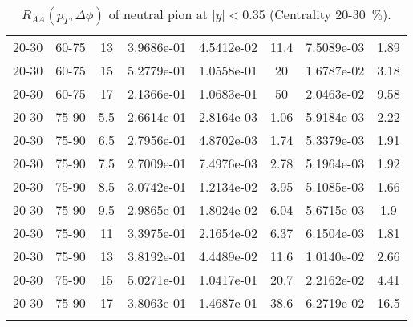 \begin{longtable}{|cccccccc|}
20-30 & 60-75 & 13 & 3.9686e-01 & 4.5412e-02 & 11.4 & 7.5089e-03 & 1.89 \\ 
20-30 & 60-75 & 15 & 5.2779e-01 & 1.0558e-01 & 20 & 1.6787e-02 & 3.18 \\ 
20-30 & 60-75 & 17 & 2.1366e-01 & 1.0683e-01 & 50 & 2.0463e-02 & 9.58 \\ 
\hline
20-30 & 75-90 & 5.5 & 2.6614e-01 & 2.8164e-03 & 1.06 & 5.9184e-03 & 2.22 \\ 
20-30 & 75-90 & 6.5 & 2.7956e-01 & 4.8702e-03 & 1.74 & 5.3379e-03 & 1.91 \\ 
20-30 & 75-90 & 7.5 & 2.7009e-01 & 7.4976e-03 & 2.78 & 5.1964e-03 & 1.92 \\ 
20-30 & 75-90 & 8.5 & 3.0742e-01 & 1.2134e-02 & 3.95 & 5.1085e-03 & 1.66 \\ 
20-30 & 75-90 & 9.5 & 2.9865e-01 & 1.8024e-02 & 6.04 & 5.6715e-03 & 1.9 \\ 
20-30 & 75-90 & 11 & 3.3975e-01 & 2.1654e-02 & 6.37 & 6.1504e-03 & 1.81 \\ 
20-30 & 75-90 & 13 & 3.8192e-01 & 4.4489e-02 & 11.6 & 1.0140e-02 & 2.66 \\ 
20-30 & 75-90 & 15 & 5.0271e-01 & 1.0417e-01 & 20.7 & 2.2162e-02 & 4.41 \\ 
20-30 & 75-90 & 17 & 3.8063e-01 & 1.4687e-01 & 38.6 & 6.2719e-02 & 16.5 \\ 
\hline
\caption{$R_{AA}(p_{T},\Delta\phi)$ of neutral pion at $|y|<0.35$ (Centrality 20-30~$\%$).}
\end{longtable}
            
